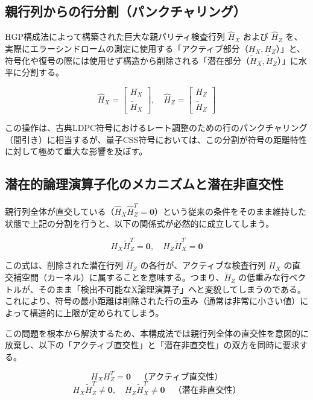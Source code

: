 \documentclass[12pt]{article}
\begin{document}
\subsection{親行列からの行分割（パンクチャリング）}
HGP構成法によって構築された巨大な親パリティ検査行列 $\hat{H}_X$ および $\hat{H}_Z$ を、実際にエラーシンドロームの測定に使用する「アクティブ部分（$H_X, H_Z$）」と、符号化や復号の際には使用せず構造から削除される「潜在部分（$\tilde{H}_X, \tilde{H}_Z$）」に水平に分割する。

\begin{equation}
    \hat{H}_X = \begin{bmatrix} H_X \\ \tilde{H}_X \end{bmatrix}, \quad
    \hat{H}_Z = \begin{bmatrix} H_Z \\ \tilde{H}_Z \end{bmatrix}
\end{equation}

この操作は、古典LDPC符号におけるレート調整のための行のパンクチャリング（間引き）に相当するが、量子CSS符号においては、この分割が符号の距離特性に対して極めて重大な影響を及ぼす。

\subsection{潜在的論理演算子化のメカニズムと潜在非直交性}
親行列全体が直交している（$\hat{H}_X \hat{H}_Z^T = \mathbf{0}$）という従来の条件をそのまま維持した状態で上記の分割を行うと、以下の関係式が必然的に成立してしまう。

\begin{equation}
    H_X \tilde{H}_Z^T = \mathbf{0}, \quad H_Z \tilde{H}_X^T = \mathbf{0}
\end{equation}

この式は、削除された潜在行列 $\tilde{H}_Z$ の各行が、アクティブな検査行列 $H_X$ の直交補空間（カーネル）に属することを意味する。つまり、$\tilde{H}_Z$ の低重みな行ベクトルが、そのまま「検出不可能なX論理演算子」へと変貌してしまうのである。これにより、符号の最小距離は削除された行の重み（通常は非常に小さい値）によって構造的に上限が定められてしまう。

この問題を根本から解決するため、本構成法では親行列全体の直交性を意図的に放棄し、以下の「アクティブ直交性」と「潜在非直交性」の双方を同時に要求する。

\begin{equation}
    H_X H_Z^T = \mathbf{0} \quad \text{（アクティブ直交性）}
\end{equation}
\begin{equation}
    H_X \tilde{H}_Z^T \neq \mathbf{0}, \quad H_Z \tilde{H}_X^T \neq \mathbf{0} \quad \text{（潜在非直交性）}
\end{equation}
\end{document}
